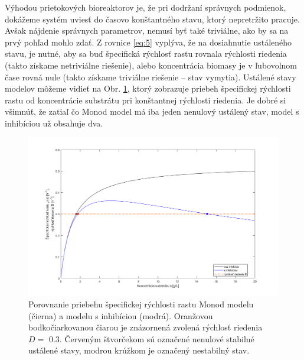 Výhodou prietokových bioreaktorov je, že pri dodržaní správnych podmienok, dokážeme systém uviesť do časovo konštantného stavu, ktorý nepretržito pracuje. Avšak nájdenie správnych parametrov, nemusí byť také triviálne, ako by sa na prvý pohľad mohlo zdať. Z rovnice \eqref{eq:5} vyplýva, že na dosiahnutie ustáleného stavu, je nutné, aby sa buď špecifická rýchlosť rastu rovnala rýchlosti riedenia (takto získame netriviálne riešenie), alebo koncentrácia biomasy je v ľubovolnom čase rovná nule (takto získame triviálne riešenie -- stav vymytia). Ustálené stavy modelov môžeme vidieť na Obr. \ref{fig:2}, ktorý zobrazuje priebeh špecifickej rýchlosti rastu od koncentrácie substrátu pri konštantnej rýchlosti riedenia. Je dobré si všimnúť, že zatiaľ čo Monod model má iba jeden nenulový ustálený stav, model s inhibíciou už obsahuje dva.

\begin{figure}
	\centering
	\includegraphics[width=.7\linewidth]{images/spec_grow_rate_comparison}
	\caption[]{Porovnanie priebehu špecifickej rýchlosti rastu Monod modelu (čierna) a modelu s inhibíciou (modrá). Oranžovou bodkočiarkovanou čiarou je znázornená zvolená rýchlosť riedenia $D = $ 0.3. Červeným štvorčekom sú označené nenulové stabilné ustálené stavy, modrou krúžkom je označený nestabilný stav.}
	\label{fig:2}
\end{figure}

